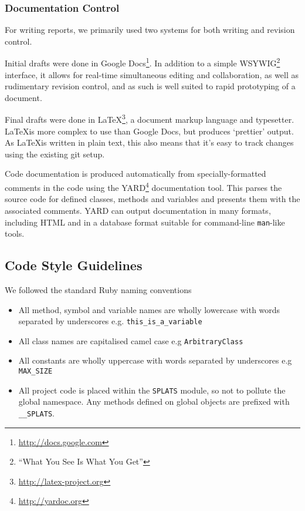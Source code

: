     \subsubsection{Documentation Control}
      For writing reports, we primarily used two systems for both writing and revision control.

      Initial drafts were done in Google Docs\footnote{\url{http://docs.google.com}}.
      In addition to a simple WSYWIG\footnote{``What You See Is What You Get''} interface, it allows for real-time simultaneous editing and collaboration, as well as rudimentary revision control, and as such is well suited to rapid prototyping of a document.

      Final drafts were done in \LaTeX\footnote{\url{http://latex-project.org}}, a document markup language and typesetter.
      \LaTeX is more complex to use than Google Docs, but produces `prettier' output. As \LaTeX is written in plain text, this also means that it's easy to track changes using the existing git setup.

      Code documentation is produced automatically from specially-formatted
comments in the code using the YARD\footnote{\url{http://yardoc.org}} documentation tool. This parses the source
code for defined classes, methods and variables and presents them with the
associated comments. YARD can output documentation in many formats, including
HTML and in a database format suitable for command-line \texttt{man}-like tools.

  \subsection{Code Style Guidelines}
  We followed the standard Ruby naming conventions
    \begin{itemize}
      \item All method, symbol and variable names are wholly lowercase with words separated by underscores e.g. \texttt{this\_is\_a\_variable}
      \item All class names are capitalised camel case e.g \texttt{ArbitraryClass}
      \item All constants are wholly uppercase with words separated by underscores e.g \texttt{MAX\_SIZE}
      \item All project code is placed within the \texttt{SPLATS} module, so not to
pollute the global namespace. Any methods defined on global
objects are prefixed with \texttt{\_\_SPLATS}.
    \end{itemize}


